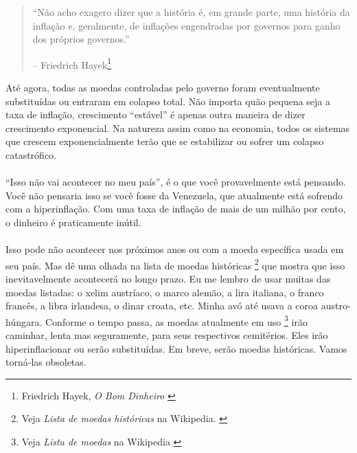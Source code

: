 \begin{quotation}\begin{samepage}
\enquote{Não acho exagero dizer que a história é, em grande parte, uma história da inflação e, geralmente, de inflações engendradas por governos para ganho dos próprios governos.}
\begin{flushright} -- Friedrich Hayek\footnote{Friedrich Hayek, \textit{O Bom Dinheiro} \cite{hayek-good-money}}
\end{flushright}\end{samepage}\end{quotation}

Até agora, todas as moedas controladas pelo governo foram eventualmente substituídas ou entraram em colapso total. Não importa quão pequena seja a taxa de inflação, crescimento \enquote{estável} é apenas outra maneira de dizer crescimento exponencial. Na natureza assim como na economia, todos os sistemas que crescem exponencialmente terão que se estabilizar ou sofrer um colapso catastrófico.

\paragraph{}
\enquote{Isso não vai acontecer no meu país}, é o que você provavelmente está pensando. Você não pensaria isso se você fosse da Venezuela, que atualmente está sofrendo com a hiperinflação. Com uma taxa de inflação de mais de um milhão por cento, o dinheiro é praticamente inútil. \cite{wiki:venezuela}

\paragraph{}
Isso pode não acontecer nos próximos anos ou com a moeda específica usada em seu país. Mas dê uma olhada na lista de moedas históricas \footnote{Veja \textit{Lista de moedas históricas} na Wikipedia. \cite{wiki:historical-currencies}} que mostra que isso inevitavelmente acontecerá no longo prazo. Eu me lembro de usar muitas das moedas listadas: o xelim austríaco, o marco alemão, a lira italiana, o franco francês, a libra irlandesa, o dinar croata, etc. Minha avó até usava a coroa austro-húngara. Conforme o tempo passa, as moedas atualmente em uso \footnote{Veja \textit{Lista de moedas} na Wikipedia \cite{wiki:lista-de-moedas}} irão caminhar, lenta mas seguramente, para seus respectivos cemitérios. Eles irão hiperinflacionar ou serão substituídas. Em breve, serão moedas históricas. Vamos torná-las obsoletas.

